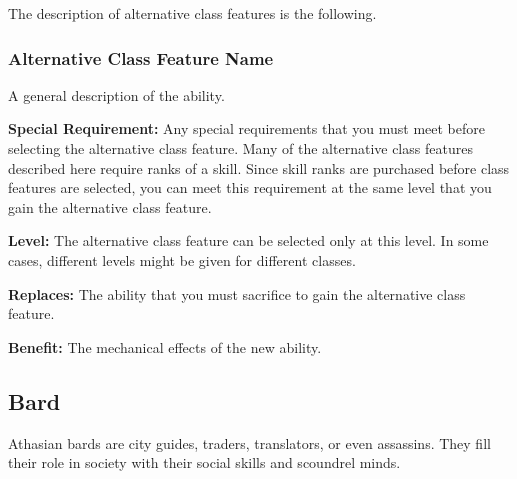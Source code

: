 The description of alternative class features is the following.

\subsubsection{Alternative Class Feature Name}
A general description of the ability.

\textbf{Special Requirement:} Any special requirements that you must meet before selecting the alternative class feature. Many of the alternative class features described here require ranks of a skill. Since skill ranks are purchased before class features are selected, you can meet this requirement at the same level that you gain the alternative class feature.

\textbf{Level:} The alternative class feature can be selected only at this level. In some cases, different levels might be given for different classes.

\textbf{Replaces:} The ability that you must sacrifice to gain the alternative class feature.

\textbf{Benefit:} The mechanical effects of the new ability.


\subsection{Bard}
Athasian bards are city guides, traders, translators, or even assassins. They fill their role in society with their social skills and scoundrel minds.

